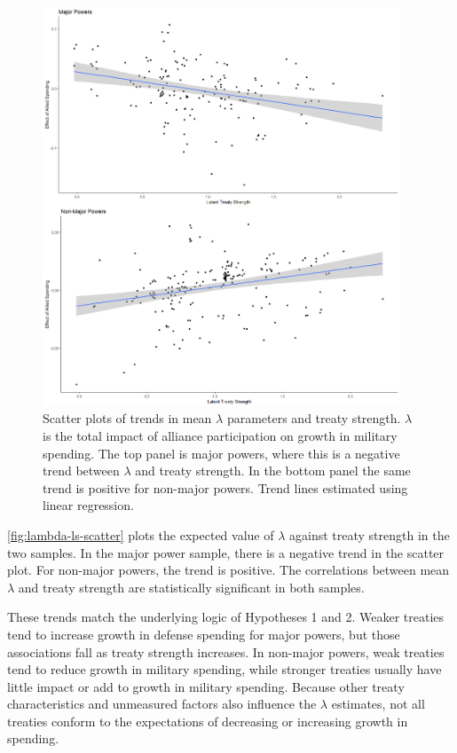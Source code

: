 \documentclass[12pt]{article}
\begin{document}
\begin{figure}[htbp]
	\centering
		\includegraphics[width=0.95\textwidth]{../figures/lambda-ls-scatter.png}
	\caption{Scatter plots of trends in mean $\lambda$ parameters and treaty strength. $\lambda$ is the total impact of alliance participation on growth in military spending. The top panel is major powers, where this is a negative trend between $\lambda$ and treaty strength. In the bottom panel the same trend is positive for non-major powers. Trend lines estimated using linear regression.}
	\label{fig:lambda-ls-scatter}
\end{figure}


\autoref{fig:lambda-ls-scatter} plots the expected value of $\lambda$ against treaty strength in the two samples. 
In the major power sample, there is a negative trend in the scatter plot.
For non-major powers, the trend is positive.
The correlations between mean $\lambda$ and treaty strength are statistically significant in both samples. 


These trends match the underlying logic of Hypotheses 1 and 2. 
Weaker treaties tend to increase growth in defense spending for major powers, but those associations fall as treaty strength increases. 
In non-major powers, weak treaties tend to reduce growth in military spending, while stronger treaties usually have little impact or add to growth in military spending. 
Because other treaty characteristics and unmeasured factors also influence the $\lambda$ estimates, not all treaties conform to the expectations of decreasing or increasing growth in spending. 
\end{document}
